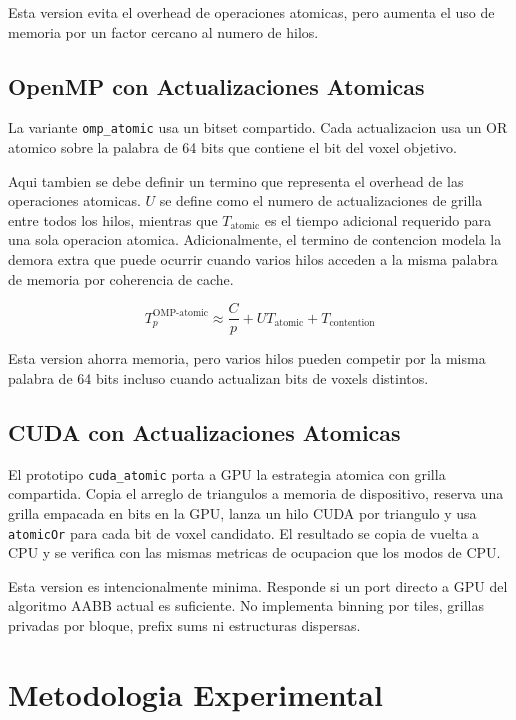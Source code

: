 \documentclass[conference]{IEEEtran}
\begin{document}
Esta version evita el overhead de operaciones atomicas, pero aumenta el uso de
memoria por un factor cercano al numero de hilos.

\subsection{OpenMP con Actualizaciones Atomicas}

La variante \texttt{omp\_atomic} usa un bitset compartido. Cada actualizacion
usa un OR atomico sobre la palabra de 64 bits que contiene el bit del voxel
objetivo.

Aqui tambien se debe definir un termino que representa el overhead de las
operaciones atomicas. $U$ se define como el numero de actualizaciones de grilla
entre todos los hilos, mientras que $T_{\text{atomic}}$ es el tiempo adicional
requerido para una sola operacion atomica. Adicionalmente, el termino de
contencion modela la demora extra que puede ocurrir cuando varios hilos acceden
a la misma palabra de memoria por coherencia de cache.

\[
    T_p^{\text{OMP-atomic}} \approx \frac{C}{p} + U T_{\text{atomic}} + T_{\text{contention}}
\]

Esta version ahorra memoria, pero varios hilos pueden competir por la misma
palabra de 64 bits incluso cuando actualizan bits de voxels distintos.

\subsection{CUDA con Actualizaciones Atomicas}

El prototipo \texttt{cuda\_atomic} porta a GPU la estrategia atomica con grilla
compartida. Copia el arreglo de triangulos a memoria de dispositivo, reserva una
grilla empacada en bits en la GPU, lanza un hilo CUDA por triangulo y usa
\texttt{atomicOr} para cada bit de voxel candidato. El resultado se copia de
vuelta a CPU y se verifica con las mismas metricas de ocupacion que los modos de
CPU.

Esta version es intencionalmente minima. Responde si un port directo a GPU del
algoritmo AABB actual es suficiente. No implementa binning por tiles, grillas
privadas por bloque, prefix sums ni estructuras dispersas.

\section{Metodologia Experimental}
\end{document}
